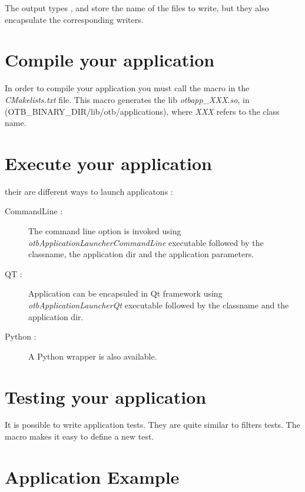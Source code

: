 The output types ,  and  store the 
name of the files to write, but they also encapsulate the corresponding writers.

\section{Compile your application}

In order to compile your application you must call the macro  in the \emph{CMakelists.txt} file. 
This macro generates the lib \emph{otbapp\_XXX.so}, in (OTB\_BINARY\_DIR/lib/otb/applications), where \emph{XXX} refers to the class name.

\section{Execute your application}

their are different ways to launch applicatons :

\begin{description}
\item[CommandLine :] The command line option is invoked using \emph{otbApplicationLauncherCommandLine} executable followed by the classname, the application dir and the application parameters.
\item[QT :] Application can be encapsuled in Qt framework using \emph{otbApplicationLauncherQt} executable followed by the classname and the application dir.
\item[Python :] A Python wrapper is also available.
\end{description}


\section{Testing your application}
\label{sec:appTesting}
It is possible to write application tests. They are quite similar to filters tests.
The macro  makes it easy to define a new test.


\section{Application Example}
\label{sec:ApplicationExample}
\ifitkFullVersion

\fi

